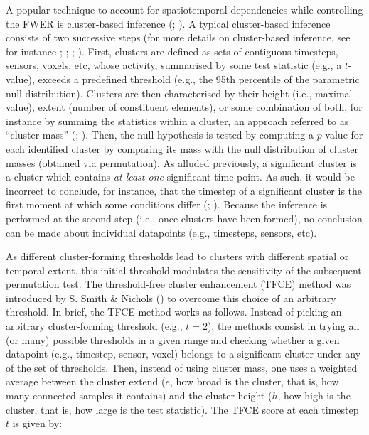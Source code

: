 \documentclass[
  doc,
  floatsintext,
  longtable,
  a4paper,
  nolmodern,
  notxfonts,
  notimes,
  colorlinks=true,linkcolor=blue,citecolor=blue,urlcolor=blue]{apa7}
\begin{document}
A popular technique to account for spatiotemporal dependencies while
controlling the FWER is cluster-based inference
(;
). A typical
cluster-based inference consists of two successive steps (for more
details on cluster-based inference, see for instance
;
; ; ). First, clusters are defined as sets of contiguous
timesteps, sensors, voxels, etc, whose activity, summarised by some test
statistic (e.g., a \(t\)-value), exceeds a predefined threshold (e.g.,
the 95th percentile of the parametric null distribution). Clusters are
then characterised by their height (i.e., maximal value), extent (number
of constituent elements), or some combination of both, for instance by
summing the statistics within a cluster, an approach referred to as
``cluster mass'' (;
). Then, the null
hypothesis is tested by computing a \(p\)-value for each identified
cluster by comparing its mass with the null distribution of cluster
masses (obtained via permutation). As alluded previously, a significant
cluster is a cluster which contains \emph{at least one} significant
time-point. As such, it would be incorrect to conclude, for instance,
that the timestep of a significant cluster is the first moment at which
some conditions differ (; ).
Because the inference is performed at the second step (i.e., once
clusters have been formed), no conclusion can be made about individual
datapoints (e.g., timesteps, sensors, etc).

As different cluster-forming thresholds lead to clusters with different
spatial or temporal extent, this initial threshold modulates the
sensitivity of the subsequent permutation test. The threshold-free
cluster enhancement (TFCE) method was introduced by S. Smith \& Nichols
() to overcome this choice of an arbitrary
threshold. In brief, the TFCE method works as follows. Instead of
picking an arbitrary cluster-forming threshold (e.g., \(t=2\)), the
methods consist in trying all (or many) possible thresholds in a given
range and checking whether a given datapoint (e.g., timestep, sensor,
voxel) belongs to a significant cluster under any of the set of
thresholds. Then, instead of using cluster mass, one uses a weighted
average between the cluster extend (\(e\), how broad is the cluster,
that is, how many connected samples it contains) and the cluster height
(\(h\), how high is the cluster, that is, how large is the test
statistic). The TFCE score at each timestep \(t\) is given by:
\end{document}
